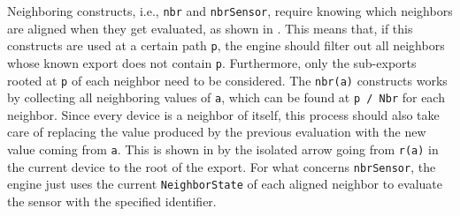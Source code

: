 Neighboring constructs, i.e., \texttt{nbr} and \texttt{nbrSensor}, require knowing which neighbors are aligned when they get evaluated, as shown in .
%
This means that, if this constructs are used at a certain path \texttt{p}, the engine should filter out all neighbors whose known export does not contain \texttt{p}.
%
Furthermore, only the sub-exports rooted at \texttt{p} of each neighbor need to be considered.
%
The \texttt{nbr(a)} constructs works by collecting all neighboring values of \texttt{a}, which can be found at \texttt{p / Nbr} for each neighbor.
%
Since every device is a neighbor of itself, this process should also take care of replacing the value produced by the previous evaluation with the new value coming from \texttt{a}.
%
This is shown in  by the isolated arrow going from \texttt{r(a)} in the current device to the root of the export.
%
For what concerns \texttt{nbrSensor}, the engine just uses the current \texttt{NeighborState} of each aligned neighbor to evaluate the sensor with the specified identifier.
%
